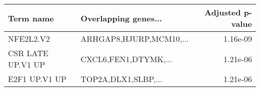 \begin{tabular}{llr}
\toprule
        Term name &    Overlapping genes... &  Adjusted p-value \\
\midrule
        NFE2L2.V2 & ARHGAP8,HJURP,MCM10,... &          1.16e-09 \\
CSR LATE UP.V1 UP &    CXCL6,FEN1,DTYMK,... &          1.21e-06 \\
    E2F1 UP.V1 UP &     TOP2A,DLX1,SLBP,... &          1.21e-06 \\
\bottomrule
\end{tabular}
